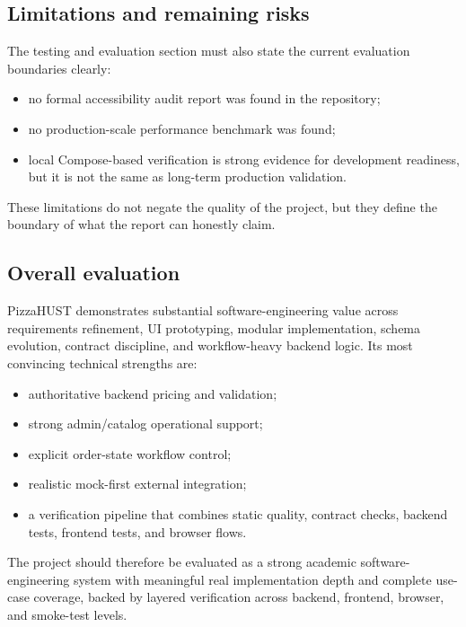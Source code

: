 \subsection{Limitations and remaining risks}

The testing and evaluation section must also state the current evaluation boundaries clearly:

\begin{itemize}
    \item no formal accessibility audit report was found in the repository;
    \item no production-scale performance benchmark was found;
    \item local Compose-based verification is strong evidence for development readiness, but it is not the same as long-term production validation.
\end{itemize}

These limitations do not negate the quality of the project, but they define the boundary of what the report can honestly claim.

\subsection{Overall evaluation}

PizzaHUST demonstrates substantial software-engineering value across requirements refinement, UI prototyping, modular implementation, schema evolution, contract discipline, and workflow-heavy backend logic. Its most convincing technical strengths are:

\begin{itemize}
    \item authoritative backend pricing and validation;
    \item strong admin/catalog operational support;
    \item explicit order-state workflow control;
    \item realistic mock-first external integration;
    \item a verification pipeline that combines static quality, contract checks, backend tests, frontend tests, and browser flows.
\end{itemize}

The project should therefore be evaluated as a strong academic software-engineering system with meaningful real implementation depth and complete use-case coverage, backed by layered verification across backend, frontend, browser, and smoke-test levels.
